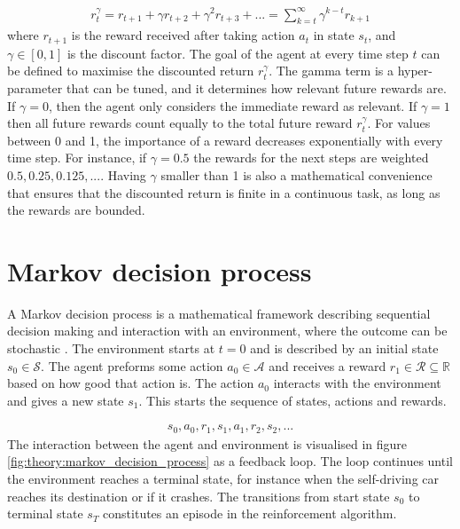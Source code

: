 \documentclass[class=book, crop=false, 11pt]{standalone}
\begin{document}
\begin{equation}
   \begin{aligned}\label{eq:theory:discounted_reward}
r^{\gamma}_{t} = r_{t+1} + \gamma r_{t+2} + \gamma^{2} r_{t+3} + ...
= \sum_{k=t}^{\infty} \gamma^{k-t}r_{k+1}
\end{aligned} 
\end{equation}
where $r_{t+1}$ is the reward received after taking action $a_{t}$ in state $s_{t}$, and $\gamma \in [0,1]$ is the discount factor. The goal of the agent at every time step $t$ can be defined to maximise the discounted return $r^{\gamma}_{t}$. The gamma term is a hyper-parameter that can be tuned, and it determines how relevant future rewards are. If $\gamma = 0$, then the agent only considers the immediate reward as relevant. If $\gamma = 1$ then all future rewards count equally to the total future reward $r^{\gamma}_{t}$. For values between 0 and 1, the importance of a reward decreases exponentially with every time step. For instance, if $\gamma = 0.5$ the rewards for the next steps are weighted $0.5, 0.25, 0.125, ...$. Having $\gamma$ smaller than 1 is also a mathematical convenience that ensures that the discounted return is finite in a continuous task, as long as the rewards are bounded. 

\section{Markov decision process}\label{section:markov_decision_process}

A Markov decision process is a mathematical framework describing sequential decision making and interaction with an environment, where the outcome can be stochastic \cite{Sutton1998}. The environment starts at $t=0$ and is described by an initial state $s_{0} \in \mathcal{S}$. The agent preforms some action $a_{0}\in \mathcal{A}$ and receives a reward $r_{1}\in \mathcal{R} \subseteq \mathbb{R} $ based on how good that action is. The action $a_{0}$ interacts with the environment and gives a new state $s_{1}$. This starts the sequence of states, actions and rewards.


\begin{equation}
   \begin{aligned}\label{eq:theory:trajectory}
s_{0},a_{0},r_{1},s_{1}, a_{1},r_{2},s_{2},...
\end{aligned} 
\end{equation}
The interaction between the agent and environment is visualised in figure \ref{fig:theory:markov_decision_process} as a feedback loop. The loop continues until the environment reaches a terminal state, for instance when the self-driving car reaches its destination or if it crashes. The transitions from start state $s_{0}$ to terminal state $s_{T}$ constitutes an episode in the reinforcement algorithm.  
\end{document}
